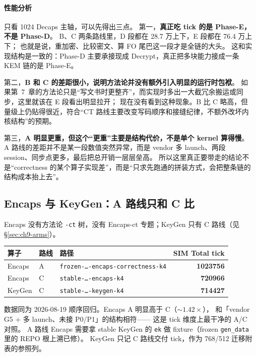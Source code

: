 \documentclass[UTF8,a4paper,11pt]{ctexart}
\theoremstyle{definition}
\theoremstyle{plain}
\theoremstyle{remark}
\numberwithin{figure}{section}
\numberwithin{table}{section}
\begin{document}
\paragraph{性能分析}
只看 1024 Decaps 主轴，可以先得出三点。
第一，\textbf{真正吃 tick 的是 Phase-E，不是 Phase-D}。
B、C 两条路线里，D 段都在 28.7 万上下，E 段都在 76.4 万上下；
也就是说，重加密、比较密文、算 FO 尾巴这一段才是全链的大头。
这和实现结构是一致的：Phase-D 主要承接现成 Decrypt，真正把多块能力接成一条 KEM 链的是 Phase-E。

第二，\textbf{B 和 C 的差距很小，说明方法论并没有额外引入明显的运行时包袱}。
如果第~7~章的方法论只是“写文书时更整齐”，而实现时多出一大截冗余搬运或同步，这里就该在 E 段看出明显拉开；
现在没有看到这种现象。B 比 C 略高，但量级上仍贴得很近，符合“CT 路线主要改变写码顺序和接缝纪律，不额外改坏内核结构”的预期。

第三，\textbf{A 明显更重，但这个“更重”主要是结构代价，不是单个 kernel 算得慢}。
A 路线的差距并不是某一段数值突然异常，而是 vendor 多 launch、两段 session、同步点更多，最后把总开销一层层垒高。
所以这里真正要带走的结论不是“correctness 的某个算子实现差”，而是“只求先跑通的拼装方式，会把整条链的结构成本抬上去”。

\subsection{Encaps 与 KeyGen：A 路线只和 C 比}
\label{sec:ch9-encaps-keygen}

Encaps 没有方法论 \texttt{-ct} 树，没有 Encaps-ct 专题；KeyGen 只有 C 路线（见 §\ref{sec:ch9-arms}）。

\begin{center}
\small
\begin{tabular}{@{}L{1cm}L{2.4cm}L{5.2cm}r@{}}
  \toprule
  算子 & 路线 & 路径 & SIM Total tick \\
  \midrule
  Encaps & A &
  \texttt{frozen-…-encaps-correctness-k4} &
  \textbf{1023756} \\
  Encaps & C &
  \texttt{stable-…-encaps-k4} &
  \textbf{720966} \\
  KeyGen & C &
  \texttt{stable-…-keygen-k4} &
  \textbf{714427} \\
  \bottomrule
\end{tabular}
\end{center}

\noindent 数据同为 2026-08-19 顺序回归。Encaps A 明显高于 C（$\sim 1.42\times$），
和「vendor G5 + 多 launch、未接 P0/P1」的结构相符——
这是 tick 维度上最干净的 A/C 对照。
 A 路线 Encaps 需要拿 stable KeyGen 的 \texttt{ek} 做 fixture（frozen \texttt{gen\_data} 里的 REPO 根上溯已修）。
KeyGen 只记 C 路线交付 tick，作为 768/512 迁移附表的参照列。
\end{document}
